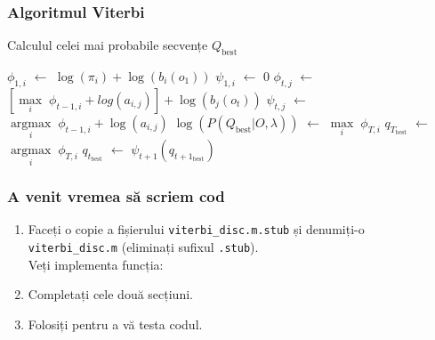\begin{frame}[fragile]
  \frametitle{Algoritmul Viterbi}
  \begin{algorithm}[H]
    \scriptsize
    \caption{Calculul celei mai probabile secvențe $Q_{\text{best}}$}
    \label{alg:viterbi}
     
    \begin{algorithmic}[2]
      \STATE $\phi_{1,i}$ $\leftarrow$ $\log(\pi_{i}) + \log(b_i(o_1))$
      \STATE $\psi_{1,i}$ $\leftarrow$ $0$
      \ENDFOR
      \STATE $\phi_{t,j}$ $\leftarrow$ $[\underset{i}{\operatorname{max}}\; \phi_{t-1,i} +
      log(a_{i,j})] + \log(b_{j}(o_{t}))$
      \STATE $\psi_{t,j}$ $\leftarrow$ $\underset{i}{\operatorname{argmax}}\; \phi_{t-1,i} +
      \log(a_{i,j})$
      \ENDFOR
      \ENDFOR
      \STATE $\log(P(Q_{\text{best}} \vert O, \lambda))$ $\leftarrow$ $\underset{i}{\operatorname{max}}\; \phi_{T,i}$
      \STATE $q_{T_{\text{best}}}$ $\leftarrow$ $\underset{i}{\operatorname{argmax}}\; \phi_{T,i}$
      \STATE $q_{t_{\text{best}}}$ $\leftarrow$ $\psi_{t+1}(q_{t+1_{\text{best}}})$
      \ENDFOR
    \end{algorithmic}
  \end{algorithm}
\end{frame}

\begin{frame}
  \frametitle{A venit vremea să scriem cod}
  \begin{enumerate}
  \item Faceți o copie a fișierului \texttt{viterbi\_disc.m.stub} 
    și denumiți-o \texttt{viterbi\_disc.m} (eliminați sufixul \texttt{.stub}).
    \\Veți implementa funcția:\\
    \pause
  \item Completați cele două secțiuni.%
    \vspace*{-1em}
    
\item Folosiți  pentru a vă testa codul.
\end{enumerate}
\end{frame}
